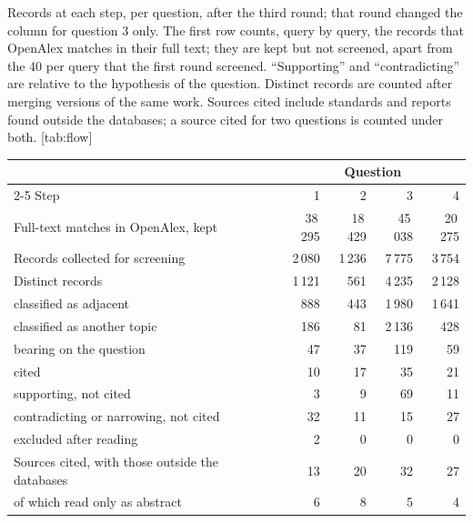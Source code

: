 \begin{table}
  \begin{sidecaption}{%
    Records at each step, per question, after the third round; that
    round changed the column for question 3 only.
    The first row counts, query by query, the records that OpenAlex
    matches in their full text; they are kept but not screened, apart
    from the 40 per query that the first round screened.
    \enquote{Supporting} and \enquote{contradicting} are relative to the
    hypothesis of the question.
    Distinct records are counted after merging versions of the same
    work.
    Sources cited include standards and reports found outside the
    databases; a source cited for two questions is counted under both.
  }[tab:flow]
    \footnotesize
    \begin{tabular}{@{}lrrrr@{}}
      \toprule
      & \multicolumn{4}{c}{Question} \\
      \cmidrule(l){2-5}
      Step & 1 & 2 & 3 & 4 \\
      \midrule
      Full-text matches in OpenAlex, kept & 38\,295 & 18\,429 & 45\,038 & 20\,275 \\
      Records collected for screening & 2\,080 & 1\,236 & 7\,775 & 3\,754 \\
      Distinct records & 1\,121 & 561 & 4\,235 & 2\,128 \\
      \quad classified as adjacent & 888 & 443 & 1\,980 & 1\,641 \\
      \quad classified as another topic & 186 & 81 & 2\,136 & 428 \\
      \quad bearing on the question & 47 & 37 & 119 & 59 \\
      \qquad cited & 10 & 17 & 35 & 21 \\
      \qquad supporting, not cited & 3 & 9 & 69 & 11 \\
      \qquad contradicting or narrowing, not cited & 32 & 11 & 15 & 27 \\
      \qquad excluded after reading & 2 & 0 & 0 & 0 \\
      \midrule
      Sources cited, with those outside the databases & 13 & 20 & 32 & 27 \\
      \quad of which read only as abstract & 6 & 8 & 5 & 4 \\
      \bottomrule
    \end{tabular}
  \end{sidecaption}
\end{table}
